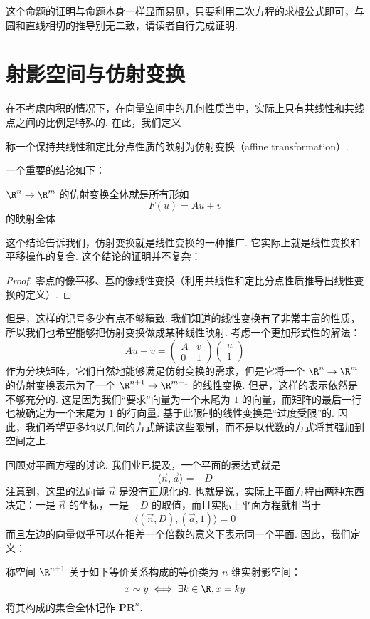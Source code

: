 这个命题的证明与命题本身一样显而易见，只要利用二次方程的求根公式即可，与圆和直线相切的推导别无二致，请读者自行完成证明.

\section{射影空间与仿射变换}

在不考虑内积的情况下，在向量空间中的几何性质当中，实际上只有共线性和共线点之间的比例是特殊的. 在此，我们定义

\begin{definition}{}{}
    称一个保持共线性和定比分点性质的映射为仿射变换（affine transformation）.
\end{definition}

一个重要的结论如下：
\begin{theorem}{}{}
    $\R^n \to \R^m$ 的仿射变换全体就是所有形如
    \[
    F(u) = A u + v
    \]
    的映射全体
\end{theorem}

这个结论告诉我们，仿射变换就是线性变换的一种推广. 它实际上就是线性变换和平移操作的复合. 这个结论的证明并不复杂：

\begin{proof}
    零点的像平移、基的像线性变换（利用共线性和定比分点性质推导出线性变换的定义）.
\end{proof}


但是，这样的记号多少有点不够精致. 我们知道的线性变换有了非常丰富的性质，所以我们也希望能够把仿射变换做成某种线性映射. 考虑一个更加形式性的解法：
\[
A u + v = \begin{pmatrix}
    A & v \\
    0 & 1
\end{pmatrix} \begin{pmatrix}
    u \\ 1
\end{pmatrix}
\]
作为分块矩阵，它们自然地能够满足仿射变换的需求，但是它将一个 $\R^n \to \R^m$ 的仿射变换表示为了一个 $\R^{n + 1} \to \R^{m + 1}$ 的线性变换. 但是，这样的表示依然是不够充分的. 这是因为我们``要求''向量为一个末尾为 $1$ 的向量，而矩阵的最后一行也被确定为一个末尾为 $1$ 的行向量. 基于此限制的线性变换是``过度受限''的. 因此，我们希望更多地以几何的方式解读这些限制，而不是以代数的方式将其强加到空间之上.

回顾对平面方程的讨论. 我们业已提及，一个平面的表达式就是
\[
\langle \vec{n}, \vec{a} \rangle = -D
\]
注意到，这里的法向量 $\vec{n}$ 是没有正规化的. 也就是说，实际上平面方程由两种东西决定：一是 $\vec{n}$ 的坐标，一是 $-D$ 的取值，而且实际上平面方程就相当于
\[
\langle (\vec{n}, D), (\vec{a}, 1) \rangle = 0
\]
而且左边的向量似乎可以在相差一个倍数的意义下表示同一个平面. 因此，我们定义：
\begin{definition}{}{}
    称空间 $\R^{n + 1}$ 关于如下等价关系构成的等价类为 $n$ 维实射影空间：
    \[
    x \sim y \iff \exists k \in \R, x = k y
    \]
    将其构成的集合全体记作 $\mathbf{PR}^n$.
\end{definition}

